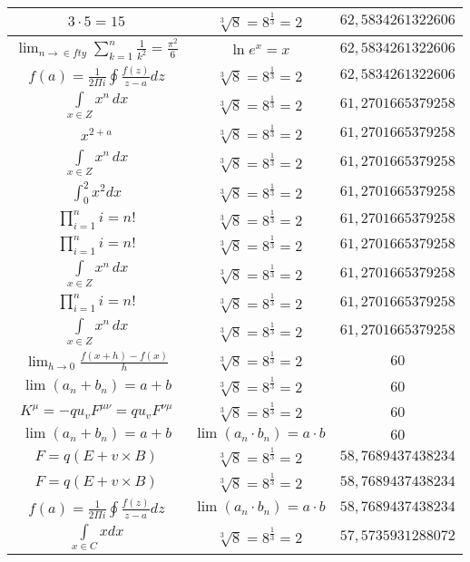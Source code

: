 \documentclass{article}
\begin{document}
\begin{flushleft}
\begin{longtable}{|c|c|c|}
$3\cdot 5=15$ & $\sqrt[3]{8}=8^{\frac{1}{3}}=2$ & $62,5834261322606$ \\ \hline 
$\lim_{n\to\in fty}\sum_{k=1}^n\frac{1}{k^2}=\frac{\pi^2}{6}$ & $\ln e^x=x$ & $62,5834261322606$ \\ \hline 
$f\left(a\right)=\frac{1}{2\Pi i}\oint\frac{f\left(z\right)}{z-a}dz$ & $\sqrt[3]{8}=8^{\frac{1}{3}}=2$ & $62,5834261322606$ \\ \hline 
$\int \limits_{x\in Z}\!x^{n}\,dx$ & $\sqrt[3]{8}=8^{\frac{1}{3}}=2$ & $61,2701665379258$ \\ \hline 
$x^{2+a}$ & $\sqrt[3]{8}=8^{\frac{1}{3}}=2$ & $61,2701665379258$ \\ \hline 
$\int \limits_{x\in Z}\!x^{n}\,dx$ & $\sqrt[3]{8}=8^{\frac{1}{3}}=2$ & $61,2701665379258$ \\ \hline 
$\int _0^2x^2dx$ & $\sqrt[3]{8}=8^{\frac{1}{3}}=2$ & $61,2701665379258$ \\ \hline 
$\prod_{i=1}^ni=n!$ & $\sqrt[3]{8}=8^{\frac{1}{3}}=2$ & $61,2701665379258$ \\ \hline 
$\prod_{i=1}^ni=n!$ & $\sqrt[3]{8}=8^{\frac{1}{3}}=2$ & $61,2701665379258$ \\ \hline 
$\int \limits_{x\in Z}\!x^{n}\,dx$ & $\sqrt[3]{8}=8^{\frac{1}{3}}=2$ & $61,2701665379258$ \\ \hline 
$\prod_{i=1}^ni=n!$ & $\sqrt[3]{8}=8^{\frac{1}{3}}=2$ & $61,2701665379258$ \\ \hline 
$\int \limits_{x\in Z}\!x^{n}\,dx$ & $\sqrt[3]{8}=8^{\frac{1}{3}}=2$ & $61,2701665379258$ \\ \hline 
$\lim_{h\to0}\frac{f(x+h)-f(x)}{h}$ & $\sqrt[3]{8}=8^{\frac{1}{3}}=2$ & $60$ \\ \hline 
$\lim\left(a_n+b_n\right)=a+b$ & $\sqrt[3]{8}=8^{\frac{1}{3}}=2$ & $60$ \\ \hline 
$K^\mu=-qu_vF^{\mu\nu}=qu_vF^{\nu\mu}$ & $\sqrt[3]{8}=8^{\frac{1}{3}}=2$ & $60$ \\ \hline 
$\lim\left(a_n+b_n\right)=a+b$ & $\lim\left(a_n\cdot b_n\right)=a\cdot b$ & $60$ \\ \hline 
$F=q\left(E+v\times B\right)$ & $\sqrt[3]{8}=8^{\frac{1}{3}}=2$ & $58,7689437438234$ \\ \hline 
$F=q\left(E+v\times B\right)$ & $\sqrt[3]{8}=8^{\frac{1}{3}}=2$ & $58,7689437438234$ \\ \hline 
$f\left(a\right)=\frac{1}{2\Pi i}\oint\frac{f\left(z\right)}{z-a}dz$ & $\lim\left(a_n\cdot b_n\right)=a\cdot b$ & $58,7689437438234$ \\ \hline 
$\int \limits_{x\in C}xdx$ & $\sqrt[3]{8}=8^{\frac{1}{3}}=2$ & $57,5735931288072$ \\ \hline 

\end{longtable}
\end{flushleft}
\end{document}
